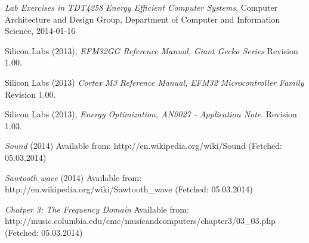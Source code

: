 
\begin{thebibliography}{9}

  \emph{Lab Exercises in TDT4258 Energy Efficient Computer Systems},
  Computer Architecture and Design Group,
  Department of Computer and Information Science,
  2014-01-16

	Silicon Labs (2013),
	\emph{EFM32GG Reference Manual, Giant Gecko Series}
	Revision 1.00.
	
	Silicon Labs (2013)
	\emph{Cortex M3 Reference Manual, EFM32 Microcontroller Family}
	Revision 1.00.

	Silicon Labs (2013),
	\emph{Energy Optimization, AN0027 - Application Note}.
	Revision 1.03.

	\emph{Sound} (2014)
	Available from: http://en.wikipedia.org/wiki/Sound
	(Fetched: 05.03.2014)

	\emph{Sawtooth wave} (2014)
	Available from: http://en.wikipedia.org/wiki/Sawtooth\_wave
	(Fetched: 05.03.2014)

	\emph{Chatper 3: The Frequency Domain}
	Available from: http://music.columbia.edu/cmc/musicandcomputers/chapter3/03\_03.php
	(Fetched: 05.03.2014)



\end{thebibliography}
